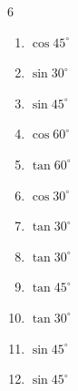 \begin{multicols}{6}
\begin{enumerate}

  \item $\displaystyle \cos{45^\circ}$


  \item $\displaystyle \sin{30^\circ}$


\columnbreak %

  \item $\displaystyle \sin{45^\circ}$


  \item $\displaystyle \cos{60^\circ}$


  \item $\displaystyle \tan{60^\circ}$


  \item $\displaystyle \cos{30^\circ}$


  \item $\displaystyle \tan{30^\circ}$


  \item $\displaystyle \tan{30^\circ}$


  \item $\displaystyle \tan{45^\circ}$

        \phantom{$\displaystyle =1$}

  \item $\displaystyle \tan{30^\circ}$


  \item $\displaystyle \sin{45^\circ}$


  \item $\displaystyle \sin{45^\circ}$


\end{enumerate}
\end{multicols}
